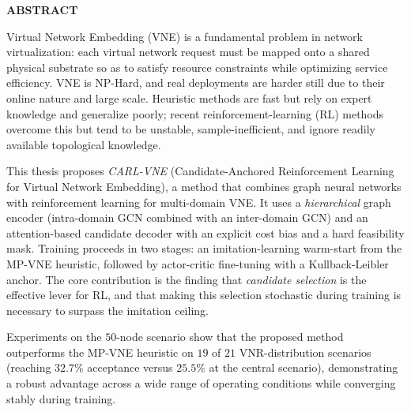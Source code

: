 \documentclass[../DoAn.tex]{subfiles}
\begin{document}
\begin{center}
    \Large{\textbf{ABSTRACT}}\\
\end{center}
\vspace{1cm}
Virtual Network Embedding (VNE) is a fundamental problem in network virtualization: each virtual network request must be mapped onto a shared physical substrate so as to satisfy resource constraints while optimizing service efficiency. VNE is NP-Hard, and real deployments are harder still due to their online nature and large scale. Heuristic methods are fast but rely on expert knowledge and generalize poorly; recent reinforcement-learning (RL) methods overcome this but tend to be unstable, sample-inefficient, and ignore readily available topological knowledge.

This thesis proposes \textit{CARL-VNE} (Candidate-Anchored Reinforcement Learning for Virtual Network Embedding), a method that combines graph neural networks with reinforcement learning for multi-domain VNE. It uses a \textit{hierarchical} graph encoder (intra-domain GCN combined with an inter-domain GCN) and an attention-based candidate decoder with an explicit cost bias and a hard feasibility mask. Training proceeds in two stages: an imitation-learning warm-start from the MP-VNE heuristic, followed by actor-critic fine-tuning with a Kullback-Leibler anchor. The core contribution is the finding that \textit{candidate selection} is the effective lever for RL, and that making this selection stochastic during training is necessary to surpass the imitation ceiling.

Experiments on the $50$-node scenario show that the proposed method outperforms the MP-VNE heuristic on $19$ of $21$ VNR-distribution scenarios (reaching $32.7\%$ acceptance versus $25.5\%$ at the central scenario), demonstrating a robust advantage across a wide range of operating conditions while converging stably during training.
\end{document}

